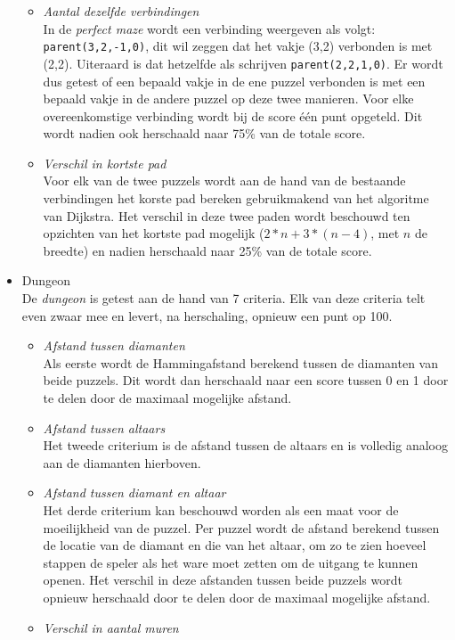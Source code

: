 \documentclass{article}
\begin{document}
\begin{itemize}
\begin{itemize}
\item \textit{Aantal dezelfde verbindingen}\\
In de \textit{perfect maze} wordt een verbinding weergeven als volgt: \texttt{parent(3,2,-1,0)}, dit wil zeggen dat het vakje (3,2) verbonden is met (2,2). Uiteraard is dat hetzelfde als schrijven \texttt{parent(2,2,1,0)}. Er wordt dus getest of een bepaald vakje in de ene puzzel verbonden is met een bepaald vakje in de andere puzzel op deze twee manieren. Voor elke overeenkomstige verbinding wordt bij de score \'e\'en punt opgeteld. Dit wordt nadien ook herschaald naar 75\% van de totale score.
\item \textit{Verschil in kortste pad}\\
Voor elk van de twee puzzels wordt aan de hand van de bestaande verbindingen het korste pad bereken gebruikmakend van het algoritme van Dijkstra. Het verschil in deze twee paden wordt beschouwd ten opzichten van het kortste pad mogelijk ($2*n + 3*(n-4)$, met $n$ de breedte) en nadien herschaald naar 25\% van de totale score.
\end{itemize}
\item Dungeon\\
De \textit{dungeon} is getest aan de hand van 7 criteria. Elk van deze criteria telt even zwaar mee en levert, na herschaling, opnieuw een punt op 100.
\begin{itemize}
\item \textit{Afstand tussen diamanten}\\
Als eerste wordt de Hammingafstand berekend tussen de diamanten van beide puzzels. Dit wordt dan herschaald naar een score tussen 0 en 1 door te delen door de maximaal mogelijke afstand.
\item \textit{Afstand tussen altaars}\\
Het tweede criterium is de afstand tussen de altaars en is volledig analoog aan de diamanten hierboven.
\item \textit{Afstand tussen diamant en altaar}\\
Het derde criterium kan beschouwd worden als een maat voor de moeilijkheid van  de puzzel. Per puzzel wordt de afstand berekend tussen de locatie van de diamant en die van het altaar, om zo te zien hoeveel stappen de speler als het ware moet zetten om de uitgang te kunnen openen. Het verschil in deze afstanden tussen beide puzzels wordt opnieuw herschaald door te delen door de maximaal mogelijke afstand.
\item \textit{Verschil in aantal muren}\\

\end{itemize}
\end{itemize}
\end{document}
